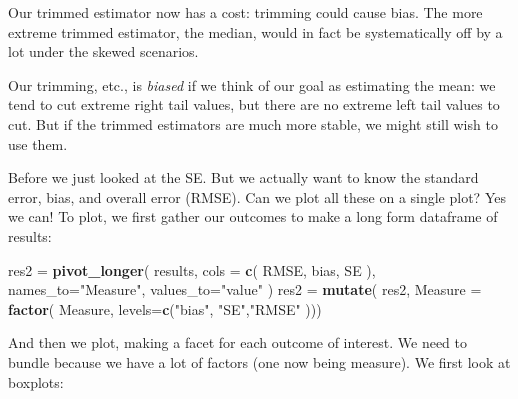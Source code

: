 \documentclass[
]{book}
\newenvironment{Shaded}{\begin{snugshade}}{\end{snugshade}}
\newcommand{\AttributeTok}[1]{\textcolor[rgb]{0.13,0.29,0.53}{#1}}
\newcommand{\DecValTok}[1]{\textcolor[rgb]{0.00,0.00,0.81}{#1}}
\newcommand{\FunctionTok}[1]{\textcolor[rgb]{0.13,0.29,0.53}{\textbf{#1}}}
\newcommand{\NormalTok}[1]{#1}
\newcommand{\OtherTok}[1]{\textcolor[rgb]{0.56,0.35,0.01}{#1}}
\newcommand{\SpecialCharTok}[1]{\textcolor[rgb]{0.81,0.36,0.00}{\textbf{#1}}}
\newcommand{\StringTok}[1]{\textcolor[rgb]{0.31,0.60,0.02}{#1}}
\begin{document}
Our trimmed estimator now has a cost: trimming could cause bias.
The more extreme trimmed estimator, the median, would in fact be systematically off by a lot under the skewed scenarios.

Our trimming, etc., is \emph{biased} if we think of our goal as estimating the
mean: we tend to cut extreme right tail values, but there are no extreme left tail values to cut.
But if the trimmed estimators are much more stable, we might still
wish to use them.

Before we just looked at the SE.
But we actually want to
know the standard error, bias, and overall error (RMSE).
Can we plot all these on a single plot? Yes we can!
To plot, we first gather our outcomes to make a long form dataframe of results:

\begin{Shaded}
\begin{Highlighting}[]
\NormalTok{res2 }\OtherTok{=} \FunctionTok{pivot\_longer}\NormalTok{( results, }\AttributeTok{cols =} \FunctionTok{c}\NormalTok{( RMSE, bias, SE ), }
                     \AttributeTok{names\_to=}\StringTok{"Measure"}\NormalTok{,}
                     \AttributeTok{values\_to=}\StringTok{"value"}\NormalTok{ )}
\NormalTok{res2 }\OtherTok{=} \FunctionTok{mutate}\NormalTok{( res2, }
               \AttributeTok{Measure =} \FunctionTok{factor}\NormalTok{( Measure, }\AttributeTok{levels=}\FunctionTok{c}\NormalTok{(}\StringTok{"bias"}\NormalTok{, }\StringTok{"SE"}\NormalTok{,}\StringTok{"RMSE"}\NormalTok{ )))}
\end{Highlighting}
\end{Shaded}

And then we plot, making a facet for each outcome of interest.
We need to bundle because we have a lot of factors (one now being measure).
We first look at boxplots:

\begin{Shaded}
\end{Shaded}
\end{document}
